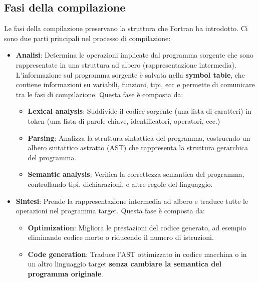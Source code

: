 \documentclass[a4paper]{article}
\begin{document}
\subsection{Fasi della compilazione}
Le fasi della compilazione preservano la struttura che Fortran ha introdotto.
Ci sono due parti principali nel processo di compilazione:
\begin{itemize}
  \item \textbf{Analisi}: Determina le operazioni implicate dal programma sorgente
    che sono rappresentate in una struttura ad albero (rappresentazione intermedia).
    L'informazione sul programma sorgente è salvata nella \textbf{symbol table},
    che contiene informazioni su variabili, funzioni, tipi, ecc e permette di
    comunicare tra le fasi di compilazione. Questa fase è composta da:
    \begin{itemize}
      \item \textbf{Lexical analysis}: Suddivide il codice sorgente (una lista di caratteri)
        in token (una lista di parole chiave, identificatori, operatori, ecc.)

      \item \textbf{Parsing}: Analizza la struttura sintattica del programma, costruendo
        un albero sintattico astratto (AST) che rappresenta la struttura gerarchica del
        programma.

      \item \textbf{Semantic analysis}: Verifica la correttezza semantica del programma,
        controllando tipi, dichiarazioni, e altre regole del linguaggio.
    \end{itemize}

  \item \textbf{Sintesi}: Prende la rappresentazione intermedia ad albero e traduce
    tutte le operazioni nel programma target. Questa fase è composta da:
    \begin{itemize}
      \item \textbf{Optimization}: Migliora le prestazioni del codice generato, ad esempio 
        eliminando codice morto o riducendo il numero di istruzioni.

      \item \textbf{Code generation}: Traduce l'AST ottimizzato in codice macchina o in un
        altro linguaggio target \textbf{senza cambiare la semantica del programma originale}.
    \end{itemize}
\end{itemize}
\end{document}
